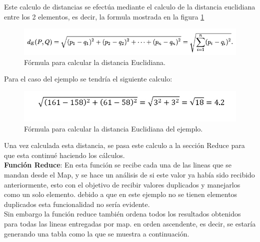 Este calculo de distancias se efectúa mediante el calculo de la distancia euclidiana entre los 2 elementos, es decir, la formula mostrada en la figura \ref{fig:distanciaEuclidiana2}\\
	\begin{figure}[H]
		\begin{center}
			\hypertarget{fig:distanciaEuclidiana}{\hspace{1pt}}
			\includegraphics{capitulo2/images/distanciaEuclidiana.png}
			\caption{Fórmula para calcular la distancia Euclidiana.}
			\label{fig:distanciaEuclidiana2}
		\end{center}
	\end{figure} 
Para el caso del ejemplo se tendría el siguiente calculo:
	\begin{figure}[H]
		\begin{center}
			\hypertarget{fig:distanciaejemplo}{\hspace{1pt}}
			\includegraphics[width=.7\textwidth]{capitulo4a/images/distanciaejemplo.jpeg}
			\caption{Fórmula para calcular la distancia Euclidiana del ejemplo.}
			\label{fig:distanciaejemplo}
		\end{center}
	\end{figure}
Una vez calculada esta distancia, se pasa este calculo a la sección Reduce para que esta continué haciendo los cálculos.
\\
\textbf{Función Reduce}: En esta función se recibe cada una de las lineas que se mandan desde el Map, y se hace un análisis de si este valor ya había sido recibido anteriormente, esto con el objetivo de recibir valores duplicados y manejarlos como un solo elemento. debido a que en este ejemplo no se tienen elementos duplicados esta funcionalidad no sería evidente. \\
Sin embargo la función reduce también ordena todos los resultados obtenidos para todas las lineas entregadas por map. en orden ascendente, es decir, se estaría generando una tabla como la que se muestra a continuación.
